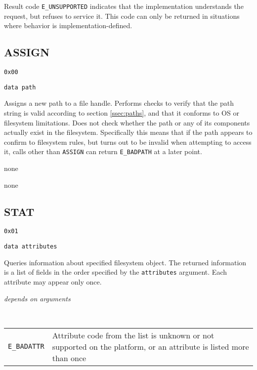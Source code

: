 Result code {\tt E\_UNSUPPORTED} indicates that the implementation understands the request, but refuses to
service it. This code can only be returned in situations where behavior is implementation-defined.

\clearpage

\subsection{ASSIGN}

\begin{description}[noitemsep,topsep=1pt]
	\item[Code:] {\tt 0x00}
	\item[Arguments:] {\tt data path}
\end{description}

Assigns a new path to a file handle. Performs checks to verify that the path string is valid according to
section \ref{ssec:paths}, and that it conforms to OS or filesystem limitations. Does not check whether the
path or any of its components actually exist in the filesystem. Specifically this means that if the path
appears to confirm to filesystem rules, but turns out to be invalid when attempting to access it, calls other
than {\tt ASSIGN} can return {\tt E\_BADPATH} at a later point.

\begin{description}[noitemsep,topsep=1pt]
	\item[Result data:] none
	\item[Specific errors:] none
\end{description}

\subsection{STAT}

\begin{description}[noitemsep,topsep=1pt]
	\item[Code:] {\tt 0x01}
	\item[Arguments:] {\tt data attributes}
\end{description}

Queries information about specified filesystem object. The returned information is a list of fields in the
order specified by the {\tt attributes} argument. Each attribute may appear only once.


\begin{description}[noitemsep,topsep=1pt]
	\item[Result data:] {\it depends on arguments}
	\item[Specific errors:] \hfill \\
		\begin{tabular}{lp{10.5cm}}
			{\tt E\_BADATTR} &
				Attribute code from the list is unknown or not supported on the platform,
				or an attribute is listed more than once \\
		\end{tabular}
\end{description}

